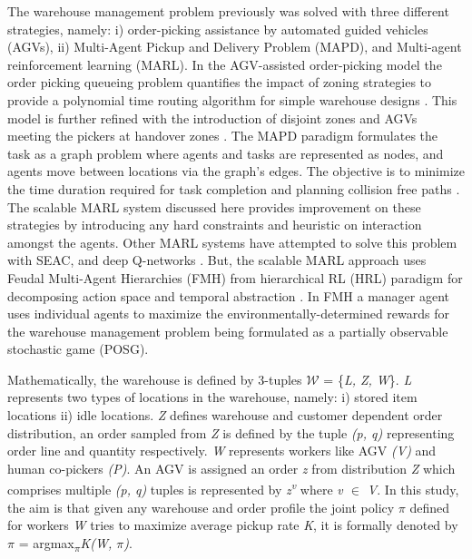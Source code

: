 \documentclass{article}
\begin{document}
The warehouse management problem previously was solved with three different  strategies, namely: i) order-picking assistance by automated guided vehicles (AGVs), ii) Multi-Agent Pickup and Delivery Problem (MAPD), and Multi-agent reinforcement learning (MARL).
In the AGV-assisted order-picking model the order picking queueing problem quantifies the impact of zoning strategies to provide a polynomial time routing algorithm for simple warehouse designs \cite{azadeh2020dynamic}.
This model is further refined with the introduction of disjoint zones and AGVs meeting the pickers at handover zones \cite{vzulj2022order}.
The MAPD paradigm formulates the task as a graph problem where agents and tasks are represented as nodes, and agents move between locations via the graph’s edges.
The objective is to minimize the time duration required for task completion and planning collision free paths \cite{xu2022multi, ma2019lifelong}.
The scalable MARL system discussed here provides improvement on these strategies by introducing any hard constraints and heuristic on interaction amongst the agents.
Other MARL systems have attempted to solve this problem with SEAC, and deep Q-networks \cite{christianos2020shared, kim2020sortation}.
But, the scalable MARL approach uses Feudal Multi-Agent Hierarchies (FMH) from hierarchical RL (HRL) paradigm for decomposing action space and temporal abstraction \cite{dayan1992feudal, barto2003recent}.
In FMH a manager agent uses individual agents to maximize the environmentally-determined rewards for the warehouse management problem being formulated as a partially observable stochastic game (POSG).



Mathematically, the warehouse is defined by 3-tuples $\mathcal{W}$ = \{\textit{L, Z, W}\}. \textit{L} represents two types of locations in the warehouse, namely: i) stored item locations ii) idle locations.
\textit{Z} defines warehouse and customer dependent order distribution, an order sampled from \textit{Z} is defined by the tuple \textit{(p, q)} representing order line and quantity respectively.
\textit{W} represents workers like AGV \textit{(V)} and human co-pickers \textit{(P)}.
An AGV is assigned an order \textit{z} from distribution \textit{Z} which comprises multiple \textit{(p, q)} tuples is represented by \textit{z\textsuperscript{v}} where \textit{v $\in$ V}.
In this study, the aim is that given any warehouse and order profile the joint policy $\pi$ defined for workers \textit{W} tries to maximize average pickup rate \textit{K}, it is formally denoted by $\pi$ = argmax\textsubscript{$\pi$}\textit{K(W, $\pi$)}.
\end{document}
